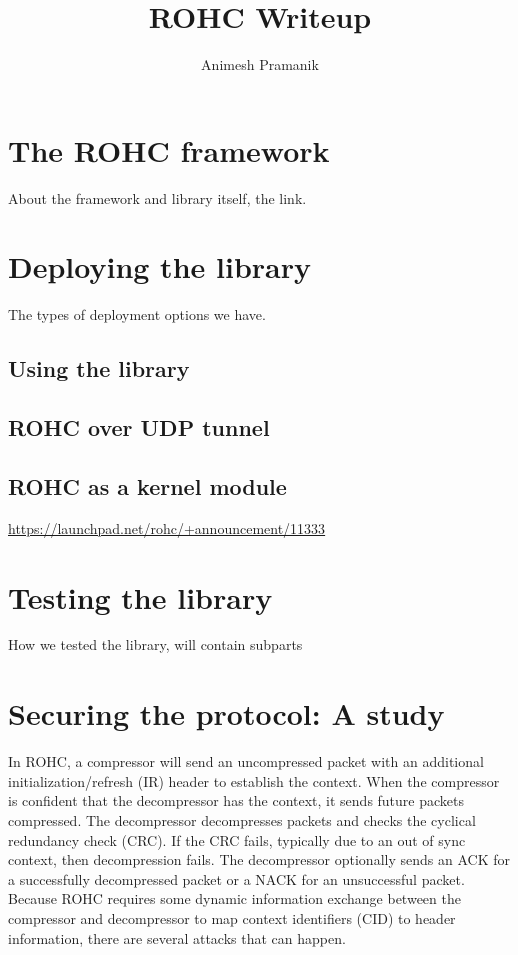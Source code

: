 \documentclass[a4paper,11pt]{article}
\author{Animesh Pramanik}
\title{ROHC Writeup}
\begin{document}
\maketitle
\pagebreak
\tableofcontents
\pagebreak

\section{The ROHC framework}
About the framework and library itself, the link.
\pagebreak

\section{Deploying the library}
The types of deployment options we have.
\subsection{Using the library}
\subsection{ROHC over UDP tunnel}
\subsection{ROHC as a kernel module}
\url{https://launchpad.net/rohc/+announcement/11333}

\pagebreak
\section{Testing the library}
How we tested the library, will contain subparts

\pagebreak
\section{Securing the protocol: A study}
In  ROHC, a compressor will send an uncompressed packet with an additional initialization/refresh (IR) header to establish the context. When the compressor is confident that the decompressor has the context, it sends future packets compressed. The decompressor decompresses packets and checks the cyclical redundancy check (CRC). If the CRC fails, typically due to an out of sync context, then decompression fails. The decompressor optionally sends an ACK for a successfully decompressed packet or a NACK for an unsuccessful packet.\\
Because ROHC requires some dynamic information exchange between the compressor and decompressor to map context  identifiers (CID) to header information, there are several attacks that can happen.
\end{document}
